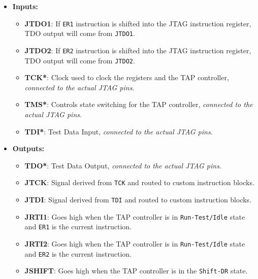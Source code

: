 \documentclass[a4paper,11pt,oneside]{report}
\begin{document}
\begin{itemize}
    \item \textbf{Inputs:}
    \begin{itemize}
        \item \textbf{JTDO1}: If \texttt{ER1} instruction is shifted into the JTAG instruction register, 
        TDO output will come from \texttt{JTDO1}.
        
        \item \textbf{JTDO2}: If \texttt{ER2} instruction is shifted into the JTAG instruction register, 
        TDO output will come from \texttt{JTDO2}.
        
        \item \textbf{TCK*}: Clock used to clock the registers and the TAP controller, 
        \emph{connected to the actual JTAG pins}.
        
        \item \textbf{TMS*}: Controls state switching for the TAP controller, 
        \emph{connected to the actual JTAG pins}.
        
        \item \textbf{TDI*}: Test Data Input, 
        \emph{connected to the actual JTAG pins}.
    \end{itemize}

    \item \textbf{Outputs:}
    \begin{itemize}
        \item \textbf{TDO*}: Test Data Output, 
        \emph{connected to the actual JTAG pins}.
        
        \item \textbf{JTCK}: Signal derived from \texttt{TCK} and routed to custom instruction blocks.
        
        \item \textbf{JTDI}: Signal derived from \texttt{TDI} and routed to custom instruction blocks.
        
        \item \textbf{JRTI1}: Goes high when the TAP controller is in \texttt{Run-Test/Idle} state 
        and \texttt{ER1} is the current instruction.
        
        \item \textbf{JRTI2}: Goes high when the TAP controller is in \texttt{Run-Test/Idle} state 
        and \texttt{ER2} is the current instruction.
        
        \item \textbf{JSHIFT}: Goes high when the TAP controller is in the \texttt{Shift-DR} state.
        

\end{itemize}
\end{itemize}
\end{document}
